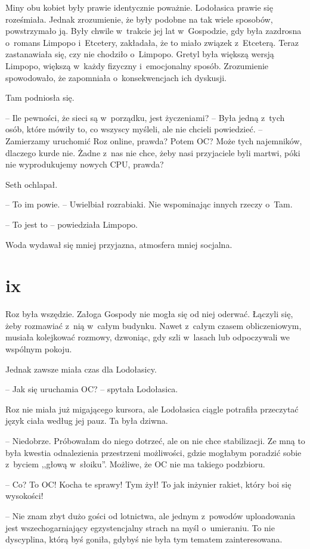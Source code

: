 \documentclass[oneside,polish,11pt,sfheadings]{mwbk}
\begin{document}
Miny obu kobiet były prawie identycznie poważnie. Lodołasica prawie się
roześmiała. Jednak zrozumienie, że były podobne na tak wiele sposobów,
powstrzymało ją. Były chwile w~trakcie jej lat w~Gospodzie, gdy była
zazdrosna o~romans Limpopo i~Etcetery, zakładała, że to miało związek z~Etceterą. Teraz zastanawiała się, czy nie chodziło o~Limpopo. Gretyl
była większą wersją Limpopo, większą w~każdy fizyczny i~emocjonalny
sposób. Zrozumienie spowodowało, że zapomniała o~konsekwencjach ich
dyskusji.

Tam podniosła się. 

-- Ile pewności, że sieci są w~porządku, jest
życzeniami? -- Była jedną z~tych osób, które mówiły to, co wszyscy
myśleli, ale nie chcieli powiedzieć. -- Zamierzamy uruchomić Roz online,
prawda? Potem OC? Może tych najemników, dlaczego kurde nie. Żadne z~nas
nie chce, żeby nasi przyjaciele byli martwi, póki nie wyprodukujemy
nowych CPU, prawda?

Seth ochlapał. 

-- To im powie. -- Uwielbiał rozrabiaki. Nie wspominając
innych rzeczy o~Tam.

-- To jest to -- powiedziała Limpopo.

Woda wydawał się mniej przyjazna, atmosfera mniej socjalna.

\chapter*{ix}

Roz była wszędzie. Załoga Gospody nie mogła się od niej oderwać. Łączyli
się, żeby rozmawiać z~nią w~całym budynku. Nawet z~całym czasem
obliczeniowym, musiała kolejkować rozmowy, dzwoniąc, gdy szli w~lasach
lub odpoczywali we wspólnym pokoju.

Jednak zawsze miała czas dla Lodołasicy.

-- Jak się uruchamia OC? -- spytała Lodołasica.

Roz nie miała już migającego kursora, ale Lodołasica ciągle potrafiła
przeczytać język ciała według jej pauz. Ta była dziwna. 

-- Niedobrze.
Próbowałam do niego dotrzeć, ale on nie chce stabilizacji. Ze mną to
była kwestia odnalezienia przestrzeni możliwości, gdzie mogłabym
poradzić sobie z~byciem ,,głową w~słoiku''. Możliwe, że OC nie ma
takiego podzbioru.

-- Co? To OC! Kocha te sprawy! Tym żył! To jak inżynier rakiet, który boi
się wysokości!

-- Nie znam zbyt dużo gości od lotnictwa, ale jednym z~powodów
uploadowania jest wszechogarniający egzystencjalny strach na myśl o~umieraniu. To nie dyscyplina, którą byś goniła, gdybyś nie była tym
tematem zainteresowana.
\end{document}
